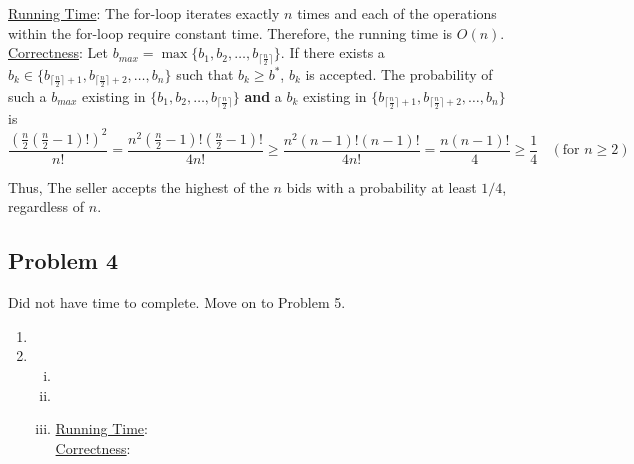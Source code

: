 \documentclass[twoside,11pt]{homework}
\begin{document}
\noindent
\underline{Running Time}:  The for-loop iterates exactly $n$ times and each of the operations within the for-loop require constant time. Therefore, the running time is $O(n)$.   \\

\noindent
\underline{Correctness}:   Let $b_{max} = \max\{b_1, b_2, \dots, b_{\lceil \frac{n}{2} \rceil}\}$.  If there exists a $b_k \in \{b_{\lceil \frac{n}{2} \rceil+1},  b_{\lceil \frac{n}{2} \rceil+2}, \dots, b_n\}$ such that $b_k \geq b^*$, $b_k$ is accepted.  The probability of such a $b_{max}$ existing in $\{b_1, b_2, \dots, b_{\lceil \frac{n}{2} \rceil}\}$ \textbf{and} a $b_k$ existing in $\{b_{\lceil \frac{n}{2} \rceil+1},  b_{\lceil \frac{n}{2} \rceil+2}, \dots, b_n\}$ is $$\frac{\left(\frac{n}{2} (\frac{n}{2} - 1)!\right)^2}{n!}  = \frac{n^2(\frac{n}{2} - 1)!(\frac{n}{2} - 1)!}{4n!} \geq \frac{n^2(n - 1)!(n - 1)!}{4n!} = \frac{n(n - 1)!}{4} \geq \frac{1}{4}  \ \ \ \  (\textrm{for } n\geq2)$$

\noindent
Thus,  The seller accepts the highest of the $n$ bids with a probability at least $1/4$, regardless of $n$. 


\subsection*{Problem 4}
Did not have time to complete. Move on to Problem 5.
\begin{enumerate}[\bf (a)]

\item 



\item 

\begin{enumerate}[i.]

\item 

\item 

\item  
\noindent
\underline{Running Time}:      \\

\noindent
\underline{Correctness}:  

\end{enumerate}
\end{enumerate}
\end{document}
